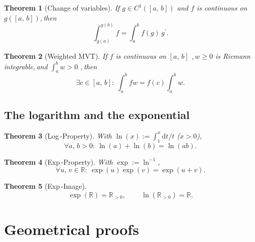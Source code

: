 \documentclass[11pt,reqno]{amsart}
\providecommand{\R}{\mathbb{R}}
\theoremstyle{redplain}
\newtheorem{theorem}{Theorem}
\begin{document}
\begin{theorem}[Change of variables]
\label{thm:subst} If $g\in C^1([a,\,\allowbreak b])$ and $f$ is continuous
on $g([a,\,\allowbreak b])$,\,\allowbreak then 
\begin{equation}  \label{eq:subst}
\int_{g(a)}^{g(b)}f=\int_a^b f(g)\,g^{\prime }.
\end{equation}
\end{theorem}

\begin{theorem}[Weighted MVT]
\label{thm:weighted-mvt} If $f$ is continuous on $[a,\,\allowbreak b]$%
,\,\allowbreak $w\ge0$ is Riemann integrable,\,\allowbreak and $\int_a^b w>0$%
,\,\allowbreak then 
\begin{equation}  \label{eq:weighted-mvt}
\exists c\in[a,\,\allowbreak b]:\ \int_a^b fw=f(c)\int_a^b w.
\end{equation}
\end{theorem}

\subsection{The logarithm and the exponential}

\begin{theorem}[Log\,-Property]
\label{thm:log} With $\ln(x):=\int_1^x \mathrm{d}t/t$ ($x>0$),\,\allowbreak 
\begin{equation}  \label{eq:log}
\forall a,\,\allowbreak b>0:\ \ln(a)+\ln(b)=\ln(ab).
\end{equation}
\end{theorem}

\begin{theorem}[Exp\,-Property]
\label{thm:exp} With $\exp:=\ln^{-1}$,\,\allowbreak 
\begin{equation}  \label{eq:exp}
\forall u,\,\allowbreak v\in\R:\ \exp(u)\exp(v)=\exp(u+v).
\end{equation}
\end{theorem}

\begin{theorem}[Exp\,-Image]
\label{thm:image} 
\begin{equation}  \label{eq:image}
\exp(\R)=\R_{>0},\,\allowbreak\qquad \ln(\R_{>0})=\R.
\end{equation}
\end{theorem}

\section{Geometrical proofs}
\end{document}

